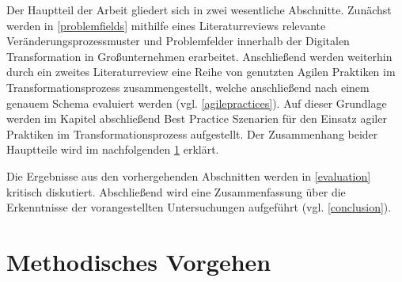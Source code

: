 Der Hauptteil der Arbeit gliedert sich in zwei wesentliche Abschnitte. Zunächst werden in \ref{problemfields} mithilfe eines Literaturreviews relevante Veränderungsprozessmuster und Problemfelder innerhalb der Digitalen Transformation in Großunternehmen erarbeitet. Anschließend werden weiterhin durch ein zweites Literaturreview eine Reihe von genutzten Agilen Praktiken im Transformationsprozess zusammengestellt, welche anschließend nach einem genauem Schema evaluiert werden (vgl. \ref{agilepractices}). Auf dieser Grundlage werden im Kapitel abschließend Best Practice Szenarien für den Einsatz agiler Praktiken im Transformationsprozess aufgestellt. Der Zusammenhang beider Hauptteile wird im nachfolgenden \ref{introduction:methods} erklärt.

Die Ergebnisse aus den vorhergehenden Abschnitten werden in \ref{evaluation} kritisch diskutiert. Abschließend wird eine Zusammenfassung über die Erkenntnisse der vorangestellten Untersuchungen aufgeführt (vgl. \ref{conclusion}).


\section{Methodisches Vorgehen}
\label{introduction:methods}


\todots
